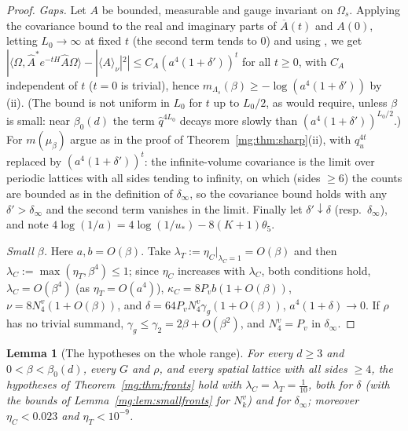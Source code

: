 \documentclass[11pt,a4paper]{article}
\newtheorem{lemma}[theorem]{Lemma}
\theoremstyle{definition}
\theoremstyle{remark}
\newcommand{\ip}[2]{\langle #1,#2\rangle}
\newcommand{\Fref}[3]{\cite[#1~`#2' (\texttt{#3})]{F}}
\newcommand{\Flab}[2]{\cite[#1 \texttt{#2}]{F}}
\begin{document}
\begin{proof}
\emph{Gaps.} Let $A$ be bounded, measurable and gauge invariant on $\Omega_s$. Applying the covariance bound to the real and imaginary parts of
$\overline A(t)$ and $A(0)$, letting $L_0\to\infty$ at fixed $t$ (the second term tends to $0$) and using \Fref{Theorem}{Ground-state expectations}{thm:gs},
we get $|\ip\Omega{\hat A^*e^{-tH}\hat A\Omega}-|\langle A\rangle_\nu|^2|\le C_A(a^4(1+\delta'))^t$ for all $t\ge0$, with $C_A$ independent of $t$
($t=0$ is trivial), hence $m_{\Lambda_s}(\beta)\ge-\log(a^4(1+\delta'))$ by \Fref{Theorem}{Gap $\Leftrightarrow$ clustering in time}{thm:gapclust}(ii).
(The bound is not uniform in $L_0$ for $t$ up to $L_0/2$, as \Flab{Corollary}{cor:gapfromcorr} would require, unless $\beta$ is small: near $\beta_0(d)$
the term $\hat q^{4L_0}$ decays more slowly than $(a^4(1+\delta'))^{L_0/2}$.) For $m(\mu_\beta)$ argue as in the proof of Theorem~\ref{mg:thm:sharp}(ii), with $q_u^{4t}$ replaced by $(a^4(1+\delta'))^t$: the
infinite-volume covariance is the limit over periodic lattices with all sides tending to infinity, on which (sides $\ge6$) the counts are bounded as in the
definition of $\delta_\infty$, so the covariance bound holds with any $\delta'>\delta_\infty$ and the second term vanishes in the limit. Finally let
$\delta'\downarrow\delta$ (resp.\ $\delta_\infty$), and note $4\log(1/a)=4\log(1/u_*)-8(K+1)\theta_5$.

\emph{Small $\beta$.} Here $a,b=O(\beta)$. Take $\lambda_T:=\eta_C|_{\lambda_C=1}=O(\beta)$ and then $\lambda_C:=\max(\eta_T,\beta^4)\le1$; since $\eta_C$
increases with $\lambda_C$, both conditions hold, $\lambda_C=O(\beta^4)$ (as $\eta_T=O(a^4)$), $\kappa_C=8P_vb(1+O(\beta))$, $\nu=8N^v_4(1+O(\beta))$, and
$\delta=64P_vN^v_4\gamma_g(1+O(\beta))$, $a^4(1+\delta)\to0$. If $\rho$ has no trivial summand, $\gamma_g\le\gamma_2=2\beta+O(\beta^2)$, and $N^v_4=P_v$ in
$\delta_\infty$.
\end{proof}

\begin{lemma}[The hypotheses on the whole range]\label{mg:lem:frontsrange}
For every $d\ge3$ and $0<\beta<\beta_0(d)$, every $G$ and $\rho$, and every spatial lattice with all sides $\ge4$, the hypotheses of
Theorem~\ref{mg:thm:fronts} hold with $\lambda_C=\lambda_T=\frac1{10}$, both for $\delta$ (with the bounds of Lemma~\ref{mg:lem:smallfronts} for $N^v_k$) and
for $\delta_\infty$; moreover $\eta_C<0.023$ and $\eta_T<10^{-9}$.
\end{lemma}
\end{document}
